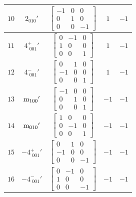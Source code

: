 \documentclass[fleqn,8pt]{jsarticle}
\begin{document}
\begin{longtable}{ccccc}
$ 10 $ & $ 2{}_{010}{}' $ & $ \begin{bmatrix} -1 & 0 & 0 \\ 0 & 1 & 0 \\ 0 & 0 & -1 \end{bmatrix} $ & $ 1 $ & $ -1 $ \\ \hline
$ 11 $ & $ 4^{+}_{\,\,001}{}' $ & $ \begin{bmatrix} 0 & -1 & 0 \\ 1 & 0 & 0 \\ 0 & 0 & 1 \end{bmatrix} $ & $ 1 $ & $ -1 $ \\ \hline
$ 12 $ & $ 4^{-}_{\,\,001}{}' $ & $ \begin{bmatrix} 0 & 1 & 0 \\ -1 & 0 & 0 \\ 0 & 0 & 1 \end{bmatrix} $ & $ 1 $ & $ -1 $ \\ \hline
$ 13 $ & $ {\rm m}_{100}{}' $ & $ \begin{bmatrix} -1 & 0 & 0 \\ 0 & 1 & 0 \\ 0 & 0 & 1 \end{bmatrix} $ & $ -1 $ & $ -1 $ \\ \hline
$ 14 $ & $ {\rm m}_{010}{}' $ & $ \begin{bmatrix} 1 & 0 & 0 \\ 0 & -1 & 0 \\ 0 & 0 & 1 \end{bmatrix} $ & $ -1 $ & $ -1 $ \\ \hline
$ 15 $ & $ -4^{+}_{\,\,001}{}' $ & $ \begin{bmatrix} 0 & 1 & 0 \\ -1 & 0 & 0 \\ 0 & 0 & -1 \end{bmatrix} $ & $ -1 $ & $ -1 $ \\ \hline
$ 16 $ & $ -4^{-}_{\,\,001}{}' $ & $ \begin{bmatrix} 0 & -1 & 0 \\ 1 & 0 & 0 \\ 0 & 0 & -1 \end{bmatrix} $ & $ -1 $ & $ -1 $ \\
\end{longtable}
\end{document}
